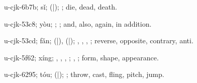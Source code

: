\begin{multicols}{2}
{\cjkgGlue{}u-cjk-6b7b; sǐ; \cjkgGlue{}\cjkgGlue{}(\cjkgGlue{}|\cjkgGlue{}); \cjkgGlue{}; die, dead, death.

\cjkgGlue{}u-cjk-53c8; yòu; \cjkgGlue{}\cjkgGlue{}\cjkgGlue{}; \cjkgGlue{}; and, also, again, in addition.

\cjkgGlue{}u-cjk-53cd; fǎn; \cjkgGlue{}\cjkgGlue{}(\cjkgGlue{}|\cjkgGlue{}), \cjkgGlue{}\cjkgGlue{}(\cjkgGlue{}|\cjkgGlue{}); \cjkgGlue{}, \cjkgGlue{}, \cjkgGlue{}, \cjkgGlue{}; reverse, opposite, contrary, anti.

\cjkgGlue{}u-cjk-5f62; xíng; \cjkgGlue{}, \cjkgGlue{}, \cjkgGlue{}, \cjkgGlue{}; \cjkgGlue{}, \cjkgGlue{}; form, shape, appearance.

\cjkgGlue{}u-cjk-6295; tóu; \cjkgGlue{}\cjkgGlue{}(\cjkgGlue{}|\cjkgGlue{}); \cjkgGlue{}; throw, cast, fling, pitch, jump.

}
\end{multicols}
